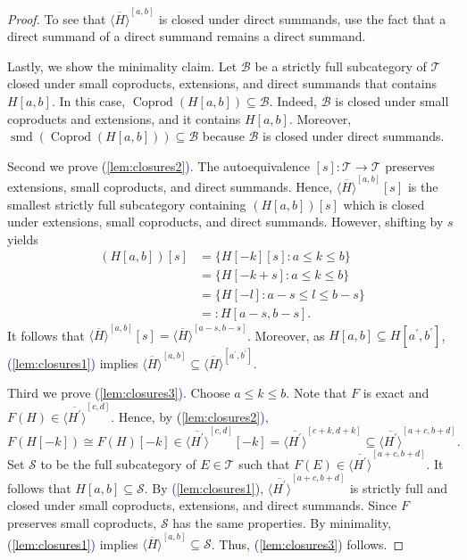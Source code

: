 \documentclass[11pt]{amsart}
\def\eqref#1{\textcolor{darkblue}{(\ref{#1})}}
\theoremstyle{plain}
\theoremstyle{definition}
\numberwithin{equation}{section}
\numberwithin{theorem}{section}
\begin{document}
\begin{proof}
    To see that $\overline{\langle H\rangle}^{[a,b]}$ is closed under direct summands, use the fact that a direct summand of a direct summand remains a direct summand.

    Lastly, we show the minimality claim. 
    Let $\mathcal{B}$ be a strictly full subcategory of $\mathcal{T}$ closed under small coproducts, extensions, and direct summands that contains $H[a,b]$.
    In this case, $\operatorname{Coprod}(H[a,b])\subseteq \mathcal{B}$. 
    Indeed, $\mathcal{B}$ is closed under small coproducts and extensions, and it contains $H[a,b]$. 
    Moreover, $\operatorname{smd}(\operatorname{Coprod}(H[a,b]))\subseteq \mathcal{B}$ because $\mathcal{B}$ is closed under direct summands. 

    Second we prove \eqref{lem:closures2}. 
    The autoequivalence $[s]\colon \mathcal{T} \to \mathcal{T}$ preserves extensions, small coproducts, and direct summands. 
    Hence, $\overline{\langle H\rangle}^{[a,b]}[s]$ is the smallest strictly full subcategory containing $(H[a,b])[s]$ which is closed under extensions, small coproducts, and direct summands.
    However, shifting by $s$ yields 
    \begin{displaymath}
        \begin{aligned}
            (H[a,b])[s] 
            &= \{ H [-k][s] : a\leq k \leq b \} 
            \\&= \{ H [-k+s] : a\leq k \leq b \}
            \\&=\{ H [-l] : a-s\leq l \leq b-s \}
            \\&=: H[a-s,b-s].
        \end{aligned}
    \end{displaymath}
    It follows that $\overline{\langle H\rangle}^{[a,b]}[s] = \overline{\langle H\rangle}^{[a-s,b-s]}$. 
    Moreover, as $H[a,b]\subseteq H[a^\prime,b^\prime]$, \eqref{lem:closures1} implies $\overline{\langle H\rangle}^{[a,b]} \subseteq \overline{\langle H\rangle}^{[a^\prime,b^\prime]}$.

    Third we prove \eqref{lem:closures3}.
    Choose $a\leq k\leq b$.
    Note that $F$ is exact and $F(H)\in \overline{\langle H^\prime\rangle}^{[c,d]}$.
    Hence, by \eqref{lem:closures2},
    \begin{displaymath}
        F(H[-k])\cong F(H)[-k]
        \in \overline{\langle H^\prime\rangle}^{[c,d]}[-k] 
        = \overline{\langle H^\prime\rangle}^{[c+k,d+k]}\subseteq \overline{\langle H^\prime\rangle}^{[a+c,b+d]}.
    \end{displaymath}
    Set $\mathcal{S}$ to be the full subcategory of $E\in \mathcal{T}$ such that $F(E)\in \overline{\langle H^\prime\rangle}^{[a+c,b+d]}$.
    It follows that $H[a,b]\subseteq \mathcal{S}$.
    By \eqref{lem:closures1}, $\overline{\langle H^\prime\rangle}^{[a+c,b+d]}$ is strictly full and closed under small coproducts, extensions, and direct summands.
    Since $F$ preserves small coproducts, $\mathcal{S}$ has the same properties.
    By minimality, \eqref{lem:closures1} implies $\overline{\langle H\rangle}^{[a,b]}\subseteq \mathcal{S}$.
    Thus, \eqref{lem:closures3} follows.


\end{proof}
\end{document}
